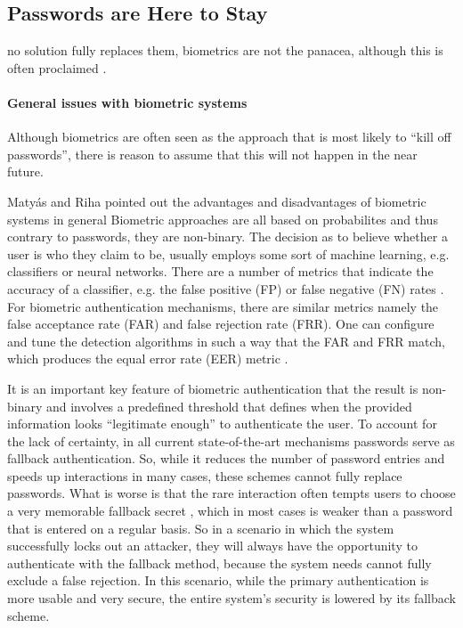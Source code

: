 \subsection{Passwords are Here to Stay}\label{sec:rw:pws_are_here_to_stay}
no solution fully replaces them, biometrics are not the panacea, although this is often proclaimed \ar.

\paragraph{General issues with biometric systems}
Although biometrics are often seen as the approach that is most likely to ``kill off passwords'', there is reason to assume that this will not happen in the near future.
	
Matyás and Riha pointed out the advantages and disadvantages of biometric systems in general \cite{Matyas2003ReliableUserAuthentication}
Biometric approaches are all based on probabilites and thus contrary to passwords, they are non-binary. The decision as to believe whether a user is who they claim to be, usually employs some sort of machine learning, e.g. classifiers or neural networks. There are a number of metrics that indicate the accuracy of a classifier, e.g. the false positive (FP) or false negative (FN) rates \ar. For biometric authentication mechanisms, there are similar metrics namely the false acceptance rate (FAR) and false rejection rate (FRR). One can configure and tune the detection algorithms in such a way that the FAR and FRR match, which produces the equal error rate (EER) metric \ar. 

It is an important key feature of biometric authentication that the result is non-binary and involves a predefined threshold that defines when the provided information looks ``legitimate enough'' to authenticate the user. To account for the lack of certainty, in all current state-of-the-art mechanisms passwords serve as fallback authentication. So, while it reduces the number of password entries and speeds up interactions in many cases, these schemes cannot fully replace passwords. What is worse is that the rare interaction often tempts users to choose a very memorable fallback secret \cite{Cherapau2015ImpactOfTouchID}, which in most cases is weaker than a password that is entered on a regular basis. So in a scenario in which the system successfully locks out an attacker, they will always have the opportunity to authenticate with the fallback method, because the system needs cannot fully exclude a false rejection. In this scenario, while the primary authentication is more usable and very secure, the entire system's security is lowered by its fallback scheme.  

